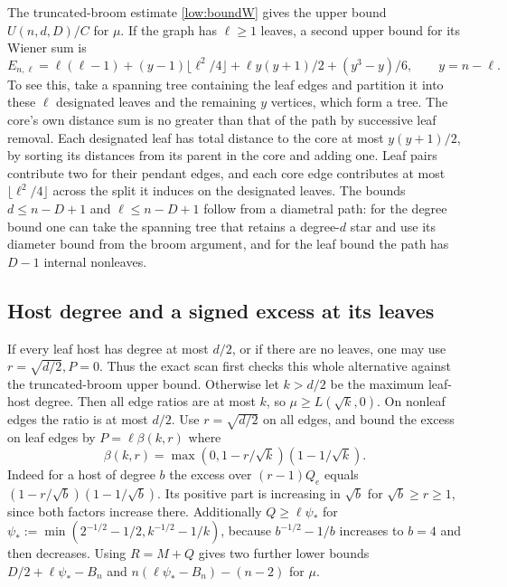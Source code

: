 The truncated-broom estimate \eqref{low:boundW} gives the upper bound
$U(n,d,D)/C$ for $\mu$. If the graph has $\ell\ge1$ leaves, a second
upper bound for its Wiener sum is
\begin{equation}\label{eq:ell}
 E_{n,\ell}=\ell(\ell-1)+(y-1)\lfloor\ell^2/4\rfloor
        +\ell y(y+1)/2+(y^3-y)/6,\qquad y=n-\ell .
\end{equation}
To see this, take a spanning tree containing the leaf edges and partition
it into these $\ell$ designated leaves and the remaining $y$ vertices,
which form a tree. The core's own distance sum is no greater than that
of the path by successive leaf removal. Each designated leaf has total
distance to the core at most $y(y+1)/2$, by sorting its distances from its
parent in the core and adding one. Leaf pairs contribute two for their
pendant edges, and each core edge contributes at most
$\lfloor\ell^2/4\rfloor$ across the split it induces on the designated leaves.
The bounds $d\le n-D+1$ and $\ell\le n-D+1$ follow from a diametral path:
for the degree bound one can take the spanning tree that retains a degree-$d$
star and use its diameter bound from the broom argument, and for the leaf
bound the path has $D-1$ internal nonleaves.

\subsection{Host degree and a signed excess at its leaves}
If every leaf host has degree at most $d/2$, or if there are no leaves,
one may use $r=\sqrt{d/2}, P=0$. Thus the exact scan first checks this
whole alternative against the truncated-broom upper bound.
Otherwise let $k>d/2$ be the maximum leaf-host degree. Then all edge ratios
are at most $k$, so $\mu\ge L(\sqrt k,0)$. On nonleaf edges the ratio
is at most $d/2$. Use $r=\sqrt{d/2}$ on all edges, and bound the excess
on leaf edges by $P=\ell\beta(k,r)$ where
\[
 \beta(k,r)=\max(0,1-r/\sqrt k)(1-1/\sqrt k).
\]
Indeed for a host of degree $b$ the excess over $(r-1)Q_e$ equals
$(1-r/\sqrt b)(1-1/\sqrt b)$. Its positive part is increasing in
$\sqrt b$ for $\sqrt b\ge r\ge1$, since both factors increase there.
Additionally $Q\ge\ell\psi_*$ for
$\psi_*:=\min(2^{-1/2}-1/2,k^{-1/2}-1/k)$, because
$b^{-1/2}-1/b$ increases to $b=4$ and then decreases.
Using $R=M+Q$ gives two further lower bounds
$D/2+\ell\psi_*-B_n$ and $n(\ell\psi_*-B_n)-(n-2)$ for $\mu$.

